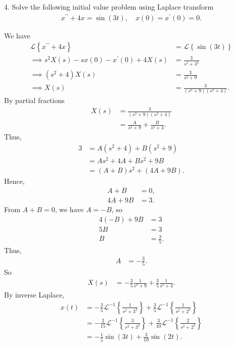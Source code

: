 \documentclass{report}
\begin{document}
    \bigbreak \noindent 
    \begin{mdframed}
        4. Solve the following initial value problem using Laplace transform
        \begin{align*}
            x^{\prime\prime} + 4x = \sin{\left(3t\right)}, \quad x(0) = x^{\prime}(0) = 0
        .\end{align*}
    \end{mdframed}
    \bigbreak \noindent 
    We have
    \begin{align*}
        \mathcal{L}\left\{x^{\prime\prime} + 4x\right\} &= \mathcal{L}\left\{\sin{\left(3t\right)}\right\} \\
        \implies s^{2}X(s) - sx(0) - x^{\prime}(0) + 4X(s) &= \frac{3}{s^{2} + 3^{2}} \\
        \implies (s^{2} + 4)X(s) &= \frac{3}{s^{2} + 9} \\
        \implies X(s) &= \frac{3}{(s^{2} + 9)(s^{2} + 4)}
    .\end{align*}
    By partial fractions
    \begin{align*}
        X(s) &= \frac{3}{(s^{2}+9)(s^{2}+4)} \\[4pt]
             &= \frac{A}{s^{2}+9} + \frac{B}{s^{2}+4}.
    \end{align*}
    Thus,
    \begin{align*}
        3 &= A(s^{2}+4) + B(s^{2}+9) \\
          &= As^{2} + 4A + Bs^{2} + 9B \\
          &= (A+B)s^{2} + (4A+9B).
    \end{align*}
    Hence,
    \begin{align*}
        A+B &= 0, \\
        4A+9B &= 3.
    \end{align*}
    From \(A+B=0\), we have \(A=-B\), so
    \begin{align*}
        4(-B)+9B &= 3 \\
        5B &= 3 \\
        B &= \frac{3}{5}.
    \end{align*}
    Thus,
    \begin{align*}
        A &= -\frac{3}{5}.
    \end{align*}
    So
    \begin{align*}
        X(s)
    &= -\frac{3}{5}\frac{1}{s^{2}+9}
    + \frac{3}{5}\frac{1}{s^{2}+4}.
    \end{align*}
    By inverse Laplace, 
    \begin{align*}
        x(t) &= -\frac{3}{5}\mathcal{L}^{-1}\left\{\frac{1}{s^{2} + 3^{2}}\right\} + \frac{3}{5}\mathcal{L}^{-1}\left\{\frac{1}{s^{2}+2^{2}}\right\} \\
        &= -\frac{3}{15}\mathcal{L}^{-1}\left\{\frac{3}{s^{2}+3^{2}}\right\} + \frac{3}{10}\mathcal{L}^{-1}\left\{\frac{2}{s^{2}+2^{2}}\right\} \\
        &=-\frac{1}{5}\sin{\left(3t\right)} + \frac{3}{10}\sin{\left(2t\right)}
    .\end{align*}
\end{document}
